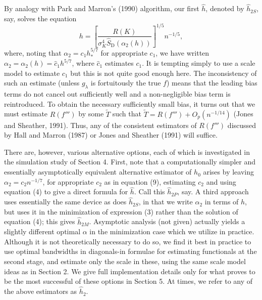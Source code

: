 \documentclass[11pt]{article}
\newcommand{\SD}{\widehat S_{\mathrm{D}}}
\begin{document}
By analogy with Park and Marron's (1990) algorithm, our first $\widehat h$, denoted by $\widehat h_{2S}$, say, solves the equation
\begin{equation}
h=\left[\frac{R(K)}{\sigma_K^4\SD(\alpha_2(h))}\right]^{1/5}n^{-1/5},
\end{equation}
where, noting that $\alpha_2=c_1h_*^{5/7}$ for appropriate $c_1$, we have written $\alpha_2=\alpha_2(h)=\widehat c_1h^{5/7}$, where $\widehat c_1$ estimates $c_1$. It is tempting simply to use a scale model to estimate $c_1$ but this is not quite good enough here. The inconsistency of such an estimate (unless $g_\lambda$ is fortuitously the true $f$) means that the leading bias terms do not cancel out sufficiently well and a non-negligible bias term is reintroduced. To obtain the necessary sufficiently small bias, it turns out that we must estimate $R(f''')$ by some $\widetilde T$ such that $\widetilde T=R(f''')+O_p(n^{-1/14})$ (Jones and Sheather, 1991). Thus, any of the consistent estimators of $R(f''')$ discussed by Hall and Marron (1987) or Jones and Sheather (1991) will suffice.

There are, however, various alternative options, each of which is investigated in the simulation study of Section 4. First, note that a computationally simpler and essentially asymptotically equivalent alternative estimator of $h_0$ arises by leaving $\alpha_2=c_2n^{-1/7}$, for appropriate $c_2$ as in equation (9), estimating $c_2$ and using equation (4) to give a direct formula for $\widehat h$. Call this $\widehat h_{2P}$, say. A third approach uses essentially the same device as does $\widehat h_{2S}$, in that we write $\alpha_2$ in terms of $h$, but uses it in the minimization of expression (3) rather than the solution of equation (4); this gives $\widehat h_{2M}$. Asymptotic analysis (not given) actually yields a slightly different optimal $\alpha$ in the minimization case which we utilize in practice. Although it is not theoretically necessary to do so, we find it best in practice to use optimal bandwidths in diagonals-in formulae for estimating functionals at the second stage, and estimate only the scale in these, using the same scale model ideas as in Section 2. We give full implementation details only for what proves to be the most successful of these options in Section 5. At times, we refer to any of the above estimators as $\widehat h_2$.
\end{document}

